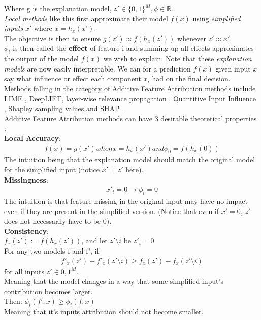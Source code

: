 \documentclass[conference]{IEEEtran}
\begin{document}
Where g is the explanation model, $z' \in \{0,1\}^M, \phi \in \mathbb{R}$. \\
\textit{Local methods} like this first approximate their model $f(x)$ using \textit{simplified inputs} $x'$ where $x = h_x(x')$.\\
The objective is then to ensure $g(z') \approx f(h_x(z'))$ whenever $z' \approx x'$. \\
$\phi_i$ is then called the \textbf{effect} of feature i and summing up all effects approximates the output of the model $f(x)$ we wish to explain. Note that these \textit{explanation models} are now easily interpretable. We can for a prediction $f(x)$ given input $x$  say what influence or effect each component $x_i$ had on the final decision.\\
Methods falling in the category of Additive Feature Attribution methods include LIME \cite{b4}, DeepLIFT\cite{b5}, layer-wise relevance propagation \cite{b6}, Quantitive Input Influence \cite{b7}, Shapley sampling values \cite{b8} and SHAP \cite{b2}.\\

Additive Feature Attribution methods can have 3 desirable theoretical properties \cite{b2}:\\

\textbf{Local Accuracy}: \\
\begin{align}
f(x) = g(x') when x = h_x(x') and \phi_0 = f(h_x(0))
\end{align}
The intuition being that the explanation model should match the original model for the simplified input (notice $x' = z'$ here). \\

\textbf{Missingness}: \\
\begin{align}
x'_i = 0 \rightarrow \phi_i = 0
\end{align}
The intuition is that feature missing in the original input may have no impact even if they are present in the simplified version. (Notice that even if $x' = 0$, $z'$ does not necessarily have to be 0).\\

\textbf{Consistency}: \\
$f_x(z') := f(h_x(z'))$, and let $z' \setminus i$ be $z'_i = 0$\\
For any two models f and f', if:
\begin{align}
f'_x(z') - f'_x(z' \setminus i) \geq f_x(z') - f_x(z' \setminus i)
\end{align}
for all inputs $z' \in {0,1}^M$. \\
Meaning that the model changes in a way that some simplified input's contribution becomes larger.\\
Then: $ \phi_i(f', x) \geq \phi_i(f,x)$ \\
Meaning that it's inputs attribution should not become smaller.\\
\end{document}
